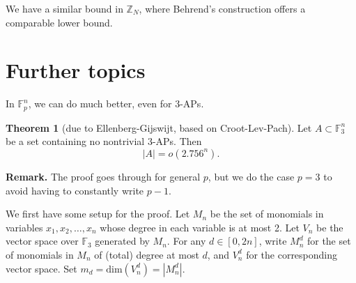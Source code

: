 \documentclass{article}
\theoremstyle{definition}
\newtheorem{theorem}{Theorem}[section]
\begin{document}
We have a similar bound in $\mathbb{Z}_N$, where Behrend's construction offers a comparable lower bound.

\section{Further topics}
In $\mathbb{F}_p^n$, we can do much better, even for 3-APs.
\begin{theorem}[due to Ellenberg-Gijswijt, based on Croot-Lev-Pach]\label{theorem4.1}
    Let $A \subset \mathbb{F}_3^n$ be a set containing no nontrivial 3-APs. Then \[
    \left|A\right| = o(2.756^n).
    \]
\end{theorem}
\textbf{Remark.} The proof goes through for general $p$, but we do the case $p=3$ to avoid having to constantly write $p-1$.
\vspace{1mm}
 
We first have some setup for the proof. Let $M_n$ be the set of monomials in variables $x_1,x_2,\ldots,x_n$ whose degree in each variable is at most 2. Let $V_n$ be the vector space over $\mathbb{F}_3$ generated by $M_n$. For any $d \in [0,2n]$, write $M_n^d$ for the set of monomials in $M_n$ of (total) degree at most $d$, and $V_n^d$ for the corresponding vector space. Set $m_d = \text{dim}(V_n^d) = \left|M_n^d\right|$.
\end{document}
